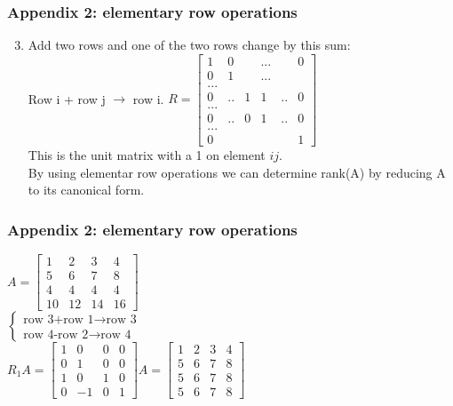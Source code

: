 \begin{frame}
	\frametitle{Appendix 2: elementary row operations}
	\begin{enumerate}
		\setcounter{enumi}{2}
		\item Add two rows and one of the two rows change by this sum:\\
		Row i + row j $\rightarrow$ row i. $R=\begin{bmatrix}
			1 & 0 & & ...& & 0\\
			0 & 1 & & ... &  & \\
			... & & & & & \\
			0 & .. & 1 & 1 & .. & 0\\
			... & & &  & & \\
			0 & .. & 0 & 1 & .. & 0\\
			... &  & & & & \\
			0 & & & & & 1
		\end{bmatrix}$\\
		This is the unit matrix with a 1 on element $ij$.\\
		By using elementar row  operations we can determine rank(A) by reducing A to its canonical form.
	\end{enumerate}
\end{frame}

\begin{frame}
	\frametitle{Appendix 2: elementary row operations}
	$A=\begin{bmatrix}
	1 & 2& 3 & 4\\
	5 & 6 & 7 & 8 \\
	4 & 4 & 4 & 4\\
	10 & 12 & 14 & 16
	\end{bmatrix}$\\
	$\begin{cases}
		\text{row 3+row 1} \rightarrow \text{row 3}\\
		\text{row 4-row 2} \rightarrow \text{row 4}
	\end{cases}$\\ $R_1A=\begin{bmatrix}
	1 & 0 & 0& 0\\
	0 & 1 & 0 & 0\\
	1 & 0 & 1 & 0\\
	0 & -1 & 0 & 1
	\end{bmatrix}A=\begin{bmatrix}
	1 & 2 & 3 & 4\\
	5 & 6 & 7 & 8\\
	5 & 6 & 7 & 8\\
	5 & 6 & 7 & 8
	\end{bmatrix}$
\end{frame}

